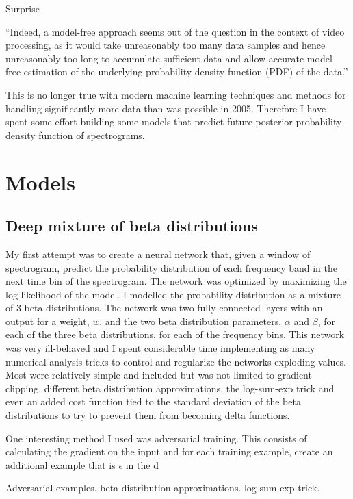 Surprise

``Indeed, a model-free approach seems out of the question in the context of video processing, as it would take unreasonably too many data samples and hence unreasonably too long to accumulate sufficient data and allow accurate model-free estimation of the underlying probability density function (PDF) of the data.''\cite{itti2005principled}

This is no longer true with modern machine learning techniques and methods for handling significantly more data than was possible in 2005. Therefore I have spent some effort building some models that predict future posterior probability density function of spectrograms.

\section{Models}

\subsection{Deep mixture of beta distributions}
My first attempt was to create a neural network that, given a window of spectrogram, predict the probability distribution of each frequency band in the next time bin of the spectrogram. The network was optimized by maximizing the log likelihood of the model. I modelled the probability distribution as a mixture of 3 beta distributions. The network was two fully connected layers with an output for a weight, $w$, and the two beta distribution parameters, $\alpha$ and $\beta$, for each of the three beta distributions, for each of the frequency bins. This network was very ill-behaved and I spent considerable time implementing as many numerical analysis tricks to control and regularize the networks exploding values. Most were relatively simple and included but was not limited to gradient clipping, different beta distribution approximations, the log-sum-exp trick and even an added cost function tied to the standard deviation of the beta distributions to try to prevent them from becoming delta functions.

One interesting method I used was adversarial training\cite{goodfellow2014explaining,lakshminarayanan2017simple}. This consists of calculating the gradient on the input and for each training example, create an additional example that is $\epsilon$ in the d

Adversarial examples.
beta distribution approximations.
log-sum-exp trick.

